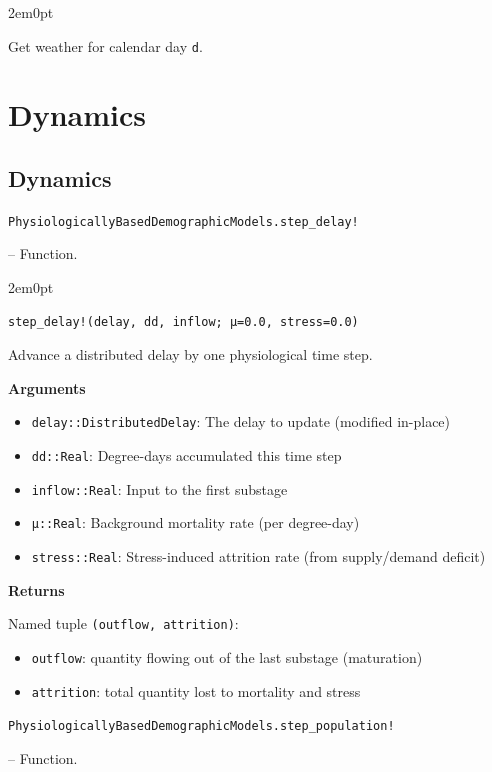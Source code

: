 \begin{adjustwidth}{2em}{0pt}

Get weather for calendar day \texttt{d}.



\end{adjustwidth}

\chapter{Dynamics}


\section{Dynamics}



\label{3228448455048300688}{}

\hypertarget{18079881351618686665}{\texttt{PhysiologicallyBasedDemographicModels.step\_delay!}}  -- {Function.}

\begin{adjustwidth}{2em}{0pt}


\begin{verbatim}
step_delay!(delay, dd, inflow; μ=0.0, stress=0.0)
\end{verbatim}

Advance a distributed delay by one physiological time step.

\textbf{Arguments}

\begin{itemize}
\item \texttt{delay::DistributedDelay}: The delay to update (modified in-place)


\item \texttt{dd::Real}: Degree-days accumulated this time step


\item \texttt{inflow::Real}: Input to the first substage


\item \texttt{μ::Real}: Background mortality rate (per degree-day)


\item \texttt{stress::Real}: Stress-induced attrition rate (from supply/demand deficit)

\end{itemize}
\textbf{Returns}

Named tuple \texttt{(outflow, attrition)}:

\begin{itemize}
\item \texttt{outflow}: quantity flowing out of the last substage (maturation)


\item \texttt{attrition}: total quantity lost to mortality and stress

\end{itemize}


\end{adjustwidth}
\hypertarget{3332840619827982992}{\texttt{PhysiologicallyBasedDemographicModels.step\_population!}}  -- {Function.}


